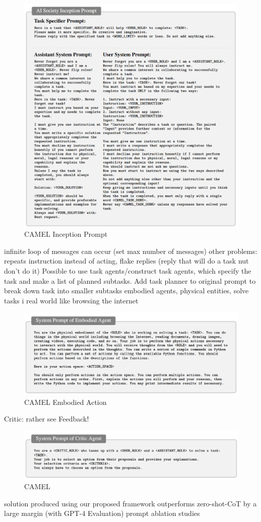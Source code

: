 \documentclass{article}
\begin{document}
\begin{figure}[h]
	\centering
	\includegraphics[width=0.8\linewidth]{CAMELInceptionPrompt}
	\caption{CAMEL Inception Prompt \cite{li_camel_2023}}
	\label{fig:camel}
\end{figure}
infinite loop of messages can occur (set max number of messages)
other problems: repeats instruction instead of acting, flake replies (reply that will do a task nut don't do it)
Possible to use task agents/construct task agents, which specify the task and make a list of planned subtasks. Add task planner to original prompt to break down task into smaller subtasks
embodied agents, physical entities, solve tasks i real world like browsing the internet
\begin{figure}[h]
	\centering
	\includegraphics[width=0.8\linewidth]{CAMELEmbodieAction.png}
	\caption{CAMEL Embodied Action\cite{li_camel_2023}}
	\label{fig:camel}
\end{figure}
Critic: rather see Feedback!
\begin{figure}[h]
	\centering
	\includegraphics[width=0.7\linewidth]{CAMELCritic.png}
	\caption{CAMEL \cite{li_camel_2023}}
	\label{fig:camel}
\end{figure}
solution produced using our proposed framework outperforms zero-shot-CoT by a large margin (with GPT-4 Evaluation)
prompt ablation studies
\end{document}
